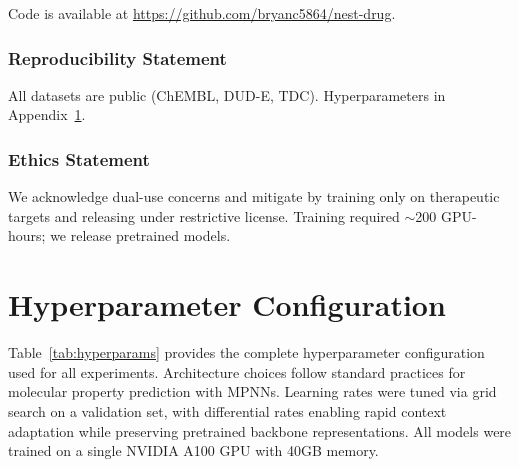 \documentclass{article}
\begin{document}
Code is available at \url{https://github.com/bryanc5864/nest-drug}.

\subsubsection*{Reproducibility Statement}
All datasets are public (ChEMBL, DUD-E, TDC). Hyperparameters in Appendix~\ref{app:hyperparams}.

\subsubsection*{Ethics Statement}
We acknowledge dual-use concerns and mitigate by training only on therapeutic targets and releasing under restrictive license. Training required $\sim$200 GPU-hours; we release pretrained models.




\appendix

\section{Hyperparameter Configuration}
\label{app:hyperparams}

Table~\ref{tab:hyperparams} provides the complete hyperparameter configuration used for all experiments. Architecture choices follow standard practices for molecular property prediction with MPNNs. Learning rates were tuned via grid search on a validation set, with differential rates enabling rapid context adaptation while preserving pretrained backbone representations. All models were trained on a single NVIDIA A100 GPU with 40GB memory.
\end{document}
